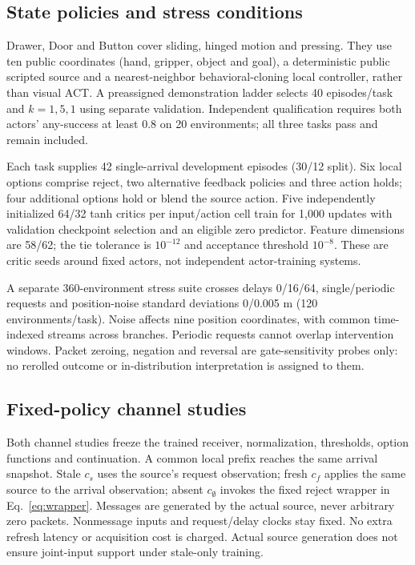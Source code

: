 \subsection{State policies and stress conditions}\label{sec:state-design}
Drawer, Door and Button cover sliding, hinged motion and pressing. They use ten public coordinates (hand, gripper, object and goal), a deterministic public scripted source and a nearest-neighbor behavioral-cloning local controller, rather than visual ACT. A preassigned demonstration ladder selects 40 episodes/task and $k=1,5,1$ using separate validation. Independent qualification requires both actors' any-success at least 0.8 on 20 environments; all three tasks pass and remain included.

Each task supplies 42 single-arrival development episodes (30/12 split). Six local options comprise reject, two alternative feedback policies and three action holds; four additional options hold or blend the source action. Five independently initialized 64/32 tanh critics per input/action cell train for 1,000 updates with validation checkpoint selection and an eligible zero predictor. Feature dimensions are 58/62; the tie tolerance is $10^{-12}$ and acceptance threshold $10^{-8}$. These are critic seeds around fixed actors, not independent actor-training systems.

A separate 360-environment stress suite crosses delays 0/16/64, single/periodic requests and position-noise standard deviations 0/0.005 m (120 environments/task). Noise affects nine position coordinates, with common time-indexed streams across branches. Periodic requests cannot overlap intervention windows. Packet zeroing, negation and reversal are gate-sensitivity probes only: no rerolled outcome or in-distribution interpretation is assigned to them.

\subsection{Fixed-policy channel studies}\label{sec:channelsetup}
Both channel studies freeze the trained receiver, normalization, thresholds, option functions and continuation. A common local prefix reaches the same arrival snapshot. Stale $c_s$ uses the source's request observation; fresh $c_f$ applies the same source to the arrival observation; absent $c_\emptyset$ invokes the fixed reject wrapper in Eq.~\eqref{eq:wrapper}. Messages are generated by the actual source, never arbitrary zero packets. Nonmessage inputs and request/delay clocks stay fixed. No extra refresh latency or acquisition cost is charged. Actual source generation does not ensure joint-input support under stale-only training.

